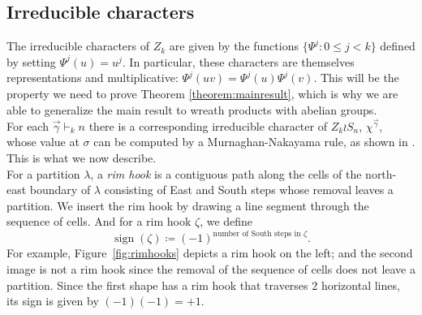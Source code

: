 \documentclass[a4paper,12pt]{amsart}
\theoremstyle{plain}
\theoremstyle{definition}
\theoremstyle{remark}
\DeclareMathOperator{\sign}{sign}
\begin{document}
\subsection{Irreducible characters}
The irreducible characters of $Z_k$ are given by the functions $\{\Psi^j : 0 \leq j < k\}$ defined by setting $\Psi^j(u)= u^j$. In particular, these characters are themselves representations and multiplicative: $\Psi^j(uv) = \Psi^j(u) \Psi^j(v)$. This will be the property we need to prove Theorem \ref{theorem:mainresult}, which is why we are able to generalize the main result to wreath products with abelian groups. \\

For each $\vec{\gamma} \vdash_k n$ there is a corresponding irreducible character of $Z_k \wr S_n$, $\chi^{\vec{\gamma}}$, whose value at $\sigma$ can be computed by a Murnaghan-Nakayama rule, as shown in \cite{MRW}. This is what we now describe. \\

For a partition $\lambda$, a \emph{rim hook} is a contiguous path along the cells of the north-east boundary of $\lambda$ consisting of East and South steps whose removal leaves a partition. 
We insert the rim hook by drawing a line segment through the sequence of cells. And for a rim hook $\zeta$, we define
\begin{equation*}
\sign(\zeta) \coloneq (-1)^{\text{number of South steps in $\zeta$}}.
\end{equation*}
For example, Figure~\ref{fig:rimhooks} depicts a rim hook on the left; and the second image is not a rim hook since the removal of the sequence of cells does not leave a partition. 
Since the first shape has a rim hook that traverses $2$ horizontal lines, its sign is given by $(-1)(-1) = +1$. \\
\end{document}
